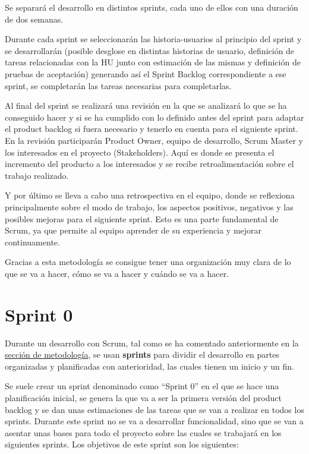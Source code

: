 Se separará el desarrollo en distintos sprints, cada uno de ellos con una duración de dos semanas.

Durante cada sprint se seleccionarán las \glspl{historia-usuario} al principio del sprint y se desarrollarán (posible desglose en distintas historias de usuario, definición de tareas relacionadas con la HU junto con estimación de las mismas y definición de pruebas de aceptación) generando así el Sprint Backlog correspondiente a ese sprint, se completarán las tareas necesarias para completarlas.

Al final del sprint se realizará una revisión en la que se analizará lo que se ha conseguido hacer y si se ha cumplido con lo definido antes del sprint para adaptar el product backlog si fuera necesario y tenerlo en cuenta para el siguiente sprint. En la revisión participarán Product Owner, equipo de desarrollo, Scrum Master y los interesados en el proyecto (Stakeholders). Aquí es donde se presenta el incremento del producto a los interesados y se recibe retroalimentación sobre el trabajo realizado.

Y por último se lleva a cabo una retrospectiva en el equipo, donde se reflexiona principalmente sobre el modo de trabajo, los aspectos positivos, negativos y las posibles mejoras para el siguiente sprint. Esto es una parte fundamental de Scrum, ya que permite al equipo aprender de su experiencia y mejorar continuamente.

Gracias a esta metodología se consigue tener una organización muy clara de lo que se va a hacer, cómo se va a hacer y cuándo se va a hacer.

\section{Sprint 0}
\label{sec:planificacion-inicial}
Durante un desarrollo con Scrum, tal como se ha comentado anteriormente en la \hyperref[sec:metodologia]{sección de metodología}, se usan \textbf{sprints} para dividir el desarrollo en partes organizadas y planificadas con anterioridad, las cuales tienen un inicio y un fin.

Se suele crear un sprint denominado como ``Sprint 0'' en el que se hace una planificación inicial, se genera la que va a ser la primera versión del product backlog y se dan unas estimaciones de las tareas que se van a realizar en todos los sprints.
Durante este sprint no se va a desarrollar funcionalidad, sino que se van a asentar unas bases para todo el proyecto sobre las cuales se trabajará en los siguientes sprints.
Los objetivos de este sprint son los siguientes:

